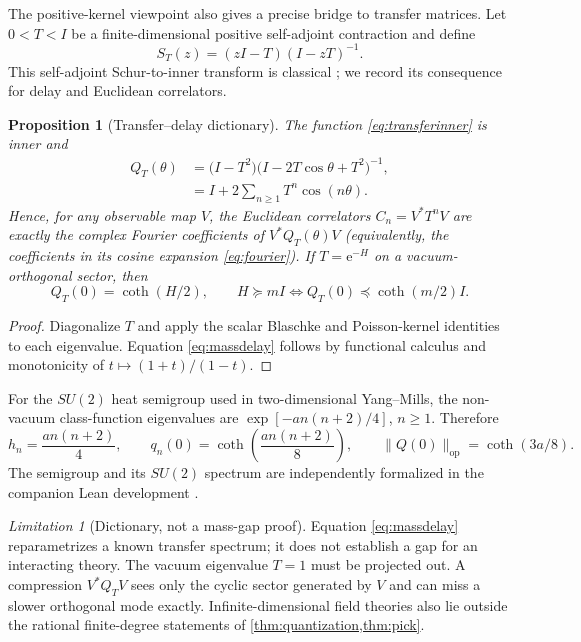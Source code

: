 \documentclass[11pt]{article}
\newtheorem{proposition}[theorem]{Proposition}
\theoremstyle{definition}
\theoremstyle{remark}
\newtheorem{limitation}[theorem]{Limitation}
\newcommand{\e}{\mathrm e}
\newcommand{\opnorm}[1]{\lVert#1\rVert_{\mathrm{op}}}
\begin{document}
The positive-kernel viewpoint also gives a precise bridge to transfer
matrices.  Let $0<T<I$ be a finite-dimensional positive self-adjoint
contraction and define
\begin{equation}\label{eq:transferinner}
 S_T(z)=(zI-T)(I-zT)^{-1}.
\end{equation}
This self-adjoint Schur-to-inner transform is classical
\cite{ArlinskiiHassi2018}; we record its consequence for delay and Euclidean
correlators.

\begin{proposition}[Transfer--delay dictionary]\label{prop:dictionary}
The function \eqref{eq:transferinner} is inner and
\begin{align}
 Q_T(\theta)
 &=\bigl(I-T^2\bigr)
 \bigl(I-2T\cos\theta+T^2\bigr)^{-1},\label{eq:poisson}\\
 &=I+2\sum_{n\geq1}T^n\cos(n\theta).\label{eq:fourier}
\end{align}
Hence, for any observable map $V$, the Euclidean correlators
$C_n=V^*T^nV$ are exactly the complex Fourier coefficients of
$V^*Q_T(\theta)V$ (equivalently, the coefficients in its cosine expansion
\eqref{eq:fourier}).  If $T=\e^{-H}$ on a vacuum-orthogonal sector, then
\begin{equation}\label{eq:massdelay}
 Q_T(0)=\coth(H/2),
 \qquad
 H\succeq mI
 \Longleftrightarrow
 Q_T(0)\preceq\coth(m/2)I.
\end{equation}
\end{proposition}

\begin{proof}
Diagonalize $T$ and apply the scalar Blaschke and Poisson-kernel identities to
each eigenvalue.  Equation \eqref{eq:massdelay} follows by functional calculus
and monotonicity of $t\mapsto(1+t)/(1-t)$.
\end{proof}

For the $SU(2)$ heat semigroup used in two-dimensional Yang--Mills, the
non-vacuum class-function eigenvalues are
$\exp[-a n(n+2)/4]$, $n\geq1$.  Therefore
\begin{equation}\label{eq:su2}
 h_n=\frac{a n(n+2)}4,
 \qquad
 q_n(0)=\coth\!\left(\frac{a n(n+2)}8\right),
 \qquad
 \opnorm{Q(0)}=\coth(3a/8).
\end{equation}
The semigroup and its $SU(2)$ spectrum are independently formalized in the
companion Lean development \cite{ErikssonLeanYM2026}.

\begin{limitation}[Dictionary, not a mass-gap proof]
Equation \eqref{eq:massdelay} reparametrizes a known transfer spectrum; it
does not establish a gap for an interacting theory.  The vacuum eigenvalue
$T=1$ must be projected out.  A compression $V^*Q_TV$ sees only the cyclic
sector generated by $V$ and can miss a slower orthogonal mode exactly.
Infinite-dimensional field theories also lie outside the rational
finite-degree statements of \cref{thm:quantization,thm:pick}.
\end{limitation}
\end{document}
